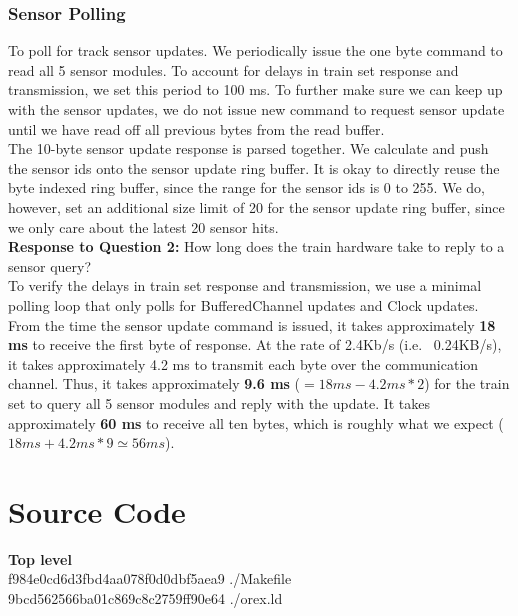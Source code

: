 \documentclass[11pt]{article}
\begin{document}
\subsubsection{Sensor Polling}
To poll for track sensor updates. We periodically issue the one byte command to read all 5 sensor modules. To account for delays in train set response and transmission, we set this period to 100 ms. To further make sure we can keep up with the sensor updates, we do not issue new command to request sensor update until we have read off all previous bytes from the read buffer.\\

\noindent
The 10-byte sensor update response is parsed together. We calculate and push the sensor ids onto the sensor update ring buffer. It is okay to directly reuse the byte indexed ring buffer, since the range for the sensor ids is 0 to 255. We do, however, set an additional size limit of 20 for the sensor update ring buffer, since we only care about the latest 20 sensor hits.\\

\noindent
\textbf{Response to Question 2:} How long does the train hardware take to reply to a sensor query? \\

\noindent
To verify the delays in train set response and transmission, we use a minimal polling loop that only polls for BufferedChannel updates and Clock updates. From the time the sensor update command is issued, it takes approximately \textbf{18 ms} to receive the first byte of response. At the rate of 2.4Kb/s (i.e. ~0.24KB/s), it takes approximately 4.2 ms to transmit each byte over the communication channel. Thus, it takes approximately \textbf{9.6 ms} ($=18ms-4.2ms*2$) for the train set to query all 5 sensor modules and reply with the update. It takes approximately \textbf{60 ms} to receive all ten bytes, which is roughly what we expect ($18ms + 4.2ms *9 \simeq 56ms$). 

\section{Source Code}

\textbf{Top level}\\
f984e0cd6d3fbd4aa078f0d0dbf5aea9  ./Makefile\\
9bcd562566ba01c869c8c2759ff90e64  ./orex.ld\\
\end{document}
